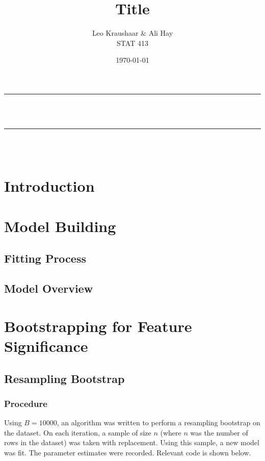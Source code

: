 \documentclass[12pt]{article}
\title{Title}
\author{Leo Kraushaar \& Ali Hay \\ STAT 413}
\date{\today}
\begin{document}
\onehalfspacing

\begin{titlepage}
    \newcommand{\HRule}{\rule{\linewidth}{0.5mm}}
    \center
    
    \HRule \\[1cm]
    { \huge \bfseries \thetitle}\\[0.4cm] 
    \HRule \\[1.8cm]
    
    \Large \thedate\\[5cm]
    
    \begin{minipage}{1\textwidth}
    \vspace{10cm}
    \begin{flushleft} \large
    \theauthor
    \end{flushleft}

    \end{minipage}
\end{titlepage}

\newpage
\section{Introduction}

\newpage
\section{Model Building}
\subsection{Fitting Process}
\subsection{Model Overview}

\newpage
\section{Bootstrapping for Feature Significance}
\subsection{Resampling Bootstrap}
\subsubsection*{Procedure}
Using $B = 10000$, an algorithm was written to perform a resampling bootstrap on the dataset. On each iteration, a sample of size $n$ (where $n$ was the number of rows in the dataset) was taken with replacement. Using this sample, a new model was fit. The parameter estimates were recorded. Relevant code is shown below.
\end{document}
